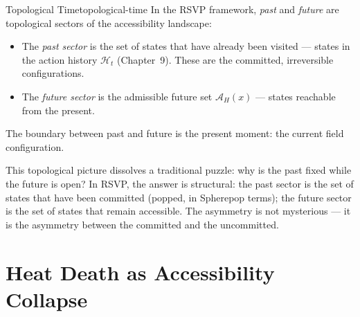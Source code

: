 \begin{definition}{Topological Time}{topological-time}
  In the RSVP framework, \emph{past} and \emph{future} are topological
  sectors of the accessibility landscape:
  \begin{itemize}
    \item The \emph{past sector} is the set of states that have already
          been visited — states in the action history $\mathcal{H}_t$
          (Chapter~9). These are the committed, irreversible configurations.
    \item The \emph{future sector} is the admissible future set
          $\mathcal{A}_H(x)$ — states reachable from the present.
  \end{itemize}
  The boundary between past and future is the present moment:
  the current field configuration.
\end{definition}

This topological picture dissolves a traditional puzzle: why is the
past fixed while the future is open? In RSVP, the answer is structural:
the past sector is the set of states that have been committed (popped,
in Spherepop terms); the future sector is the set of states that remain
accessible. The asymmetry is not mysterious — it is the asymmetry between
the committed and the uncommitted.

\section{Heat Death as Accessibility Collapse}


